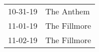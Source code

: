 \begin{supertabular}{p{0.25\columnwidth}p{0.75\columnwidth}}
 10-31-19 &    The Anthem \\
 11-01-19 &  The Fillmore \\
 11-02-19 &  The Fillmore \\
\end{supertabular}
